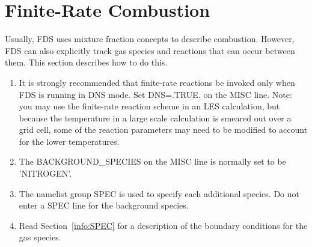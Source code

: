 \documentclass[11pt]{book}
\begin{document}
\section{Finite-Rate Combustion}
\label{info:finite}

Usually, FDS uses mixture fraction concepts to describe combustion. However, FDS can also explicitly track gas species and
reactions that can occur between them. This section describes how to do this.

\begin{enumerate}
\item It is strongly recommended that finite-rate reactions be invoked only
when FDS is running in DNS mode. Set {\ct DNS=.TRUE.} on the {\ct MISC} line.
Note: you may use the finite-rate reaction scheme in an
LES calculation, but because the temperature in a large scale calculation
is smeared out over a grid cell, some of the reaction parameters may need
to be modified to account for the lower temperatures.

\item The {\ct BACKGROUND\_SPECIES} on the {\ct MISC} line is normally
set to be {\ct 'NITROGEN'}.

\item The namelist group {\ct SPEC} is used to specify each additional
species. Do not enter a {\ct SPEC} line for the background species.

\item Read Section~\ref{info:SPEC} for a description of the boundary
conditions for the gas species.


\end{enumerate}
\end{document}
